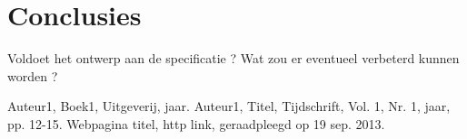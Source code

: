 \documentclass[11pt,twoside,a4paper]{article}
\begin{document}
\section{Conclusies}
Voldoet het ontwerp aan de specificatie ?
Wat zou er eventueel verbeterd kunnen worden ?

\begin{thebibliography}{9}
Auteur1, 
Boek1, 
Uitgeverij, 
jaar.
Auteur1, 
Titel, 
Tijdschrift, 
Vol. 1, 
Nr. 1, 
jaar, 
pp. 12-15.
Webpagina titel, 
http link, 
geraadpleegd op 19 sep. 2013.
\end{thebibliography}
\end{document}
